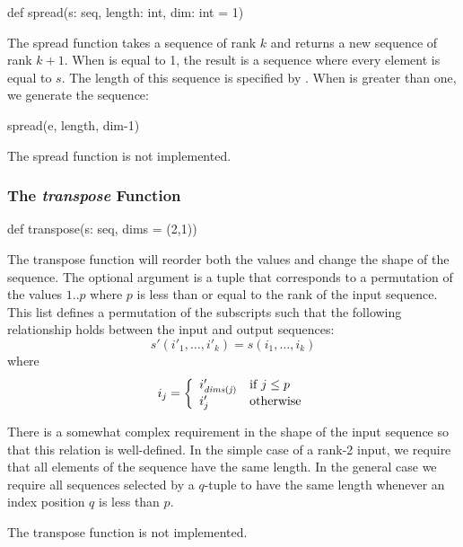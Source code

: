 \begin{chapel}
def spread(s: seq, length: int, dim: int = 1)
\end{chapel}

The spread function takes a sequence of rank $k$ and returns a new
sequence of rank $k+1$.  When  is equal to 1, the result is
a sequence where every element is equal to $s$.  The length of this
sequence is specified by .  When  is greater
than one, we generate the sequence:
\begin{chapel}
[e in s] spread(e, length, dim-1)
\end{chapel}

\begin{implementation}
The spread function is not implemented.
\end{implementation}

\subsubsection{The {\em transpose} Function}
\label{The_em_transpose_Function}

\begin{chapel}
def transpose(s: seq, dims = (2,1))
\end{chapel}

The transpose function will reorder both the values and change the
shape of the sequence. The optional  argument is a tuple
that corresponds to a permutation of the values $1..p$ where $p$ is
less than or equal to the rank of the input sequence. This list
defines a permutation of the subscripts such that the following
relationship holds between the input and output sequences:
$$
    s'(i'_1,\ldots,i'_k) = s(i_1,\ldots,i_k)
$$
where
$$
    i_j = \left\{\begin{array}{ll}
                 i'_{\it dims(j)} & \mbox{if $j\le p$}\\
		 i'_j & \mbox{otherwise}
		 \end{array}
          \right.
$$

There is a somewhat complex requirement in the shape of the input
sequence so that this relation is well-defined. In the simple case of
a rank-2 input, we require that all elements of the sequence have the
same length.  In the general case we require all sequences selected by
a $q$-tuple to have the same length whenever an index position $q$ is
less than $p$.

\begin{implementation}
The transpose function is not implemented.
\end{implementation}

